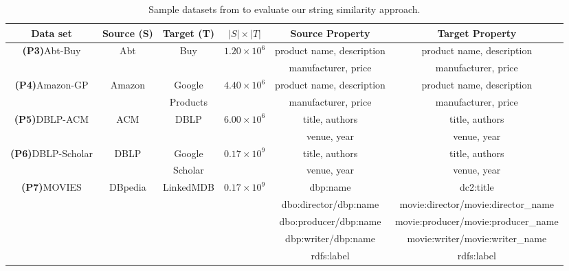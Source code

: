 \documentclass[sw]{iosart2x}
\begin{document}
\begin{table}[htb]
\centering
\caption{Sample datasets from \cite{georgala2018dynamic} to evaluate our string similarity approach.}
\label{tab:TableFmeasure}
\resizebox{1.0\textwidth}{!}
{
\begin{tabular}{*{6}{c}} \hline
    \textbf{Data set}           & \textbf{Source (S)} & \textbf{Target (T)} & \textbf{$|S| \times |T|$} & \textbf{Source Property} & \textbf{Target Property}                           \\ \hline
    
    \textbf{(P3)}Abt-Buy    & Abt & Buy  & $1.20 \times 10^6$ & product name, description                       & product name, description                         \\
                                &&&& manufacturer, price               & manufacturer, price                       \\ \hline
    \textbf{(P4)}Amazon-GP  & Amazon & Google & $4.40 \times 10^6$ & product name, description                 & product name, description                         \\ 
                                && Products && manufacturer, price               & manufacturer, price                       \\ \hline
    \textbf{(P5)}DBLP-ACM  & ACM & DBLP& $6.00 \times 10^6$ & title, authors                    & title, authors                            \\
                                &&&& venue, year                       & venue, year                               \\ \hline
    \textbf{(P6)}DBLP-Scholar& DBLP & Google  & $ 0.17 \times 10^9$ & title, authors                    & title, authors                            \\
                                && Scholar && venue, year                       & venue, year                               \\ \hline
    \textbf{(P7)}MOVIES   & DBpedia & LinkedMDB & $0.17 \times 10^9$ & dbp:name                          & dc2:title     \\
                                &&&& dbo:director/dbp:name             & movie:director/movie:director\_name       \\
                                &&&& dbo:producer/dbp:name             & movie:producer/movie:producer\_name       \\
                                &&&& dbp:writer/dbp:name            & movie:writer/movie:writer\_name           \\
                                &&&& rdfs:label & rdfs:label           \\ 
                                \hline
\end{tabular}
}
\end{table}
\end{document}

